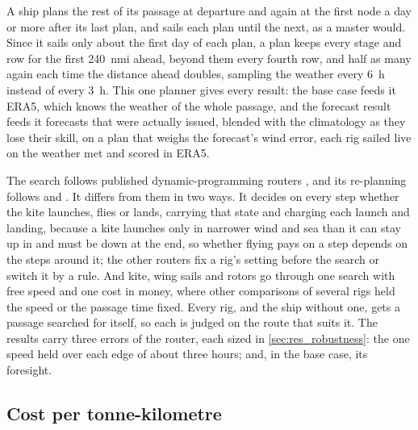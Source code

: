 A ship plans the rest of its passage at departure and again at the first node a day or more after its last plan, and sails each plan until the next, as a master would. Since it sails only about the first day of each plan, a plan keeps every stage and row for the first \SI{240}{nmi} ahead, beyond them every fourth row, and half as many again each time the distance ahead doubles, sampling the weather every \SI{6}{h} instead of every \SI{3}{h}. This one planner gives every result: the base case feeds it ERA5, which knows the weather of the whole passage, and the forecast result feeds it forecasts that were actually issued, blended with the climatology as they lose their skill, on a plan that weighs the forecast's wind error, each rig sailed live on the weather met and scored in ERA5.

The search follows published dynamic-programming routers \citep{wei2012,shao2012}, and its re-planning follows \citet{hagiwara1989} and \citet{mason2023}. It differs from them in two ways. It decides on every step whether the kite launches, flies or lands, carrying that state and charging each launch and landing, because a kite launches only in narrower wind and sea than it can stay up in and must be down at the end, so whether flying pays on a step depends on the steps around it; the other routers fix a rig's setting before the search or switch it by a rule. And kite, wing sails and rotors go through one search with free speed and one cost in money, where other comparisons of several rigs held the speed \citep{bentin2018} or the passage time \citep{dupuy2025thesis} fixed. Every rig, and the ship without one, gets a passage searched for itself, so each is judged on the route that suits it. The results carry three errors of the router, each sized in \cref{sec:res_robustness}:  the one speed held over each edge of about three hours; and, in the base case, its foresight.

\subsection{Cost per tonne-kilometre}
\label{sec:cost_model}

